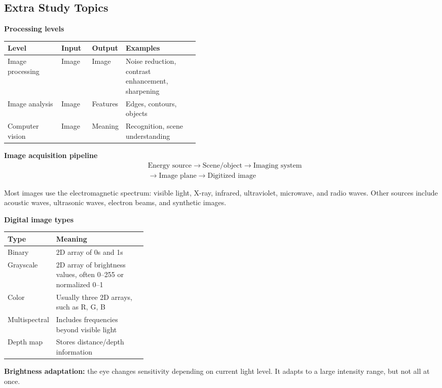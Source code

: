 \documentclass[8pt]{extarticle}
\begin{document}
\begin{multicols}{2}
\section{Extra Study Topics}

\textbf{Processing levels}

\begin{tabularx}{\linewidth}{@{}p{0.28\linewidth}p{0.16\linewidth}Y Y@{}}
\toprule
\textbf{Level} & \textbf{Input} & \textbf{Output} & \textbf{Examples} \\
\midrule
Image processing & Image & Image & Noise reduction, contrast enhancement, sharpening \\
Image analysis & Image & Features & Edges, contours, objects \\
Computer vision & Image & Meaning & Recognition, scene understanding \\
\bottomrule
\end{tabularx}

\textbf{Image acquisition pipeline}
\begin{align*}
&\text{Energy source}\rightarrow\text{Scene/object}\rightarrow\text{Imaging system}\\
&\rightarrow\text{Image plane}\rightarrow\text{Digitized image}
\end{align*}

Most images use the electromagnetic spectrum: visible light, X-ray, infrared, ultraviolet, microwave, and radio waves. Other sources include acoustic waves, ultrasonic waves, electron beams, and synthetic images.

\textbf{Digital image types}

\begin{tabularx}{\linewidth}{@{}p{0.32\linewidth}Y@{}}
\toprule
\textbf{Type} & \textbf{Meaning} \\
\midrule
Binary & 2D array of 0s and 1s \\
Grayscale & 2D array of brightness values, often 0--255 or normalized 0--1 \\
Color & Usually three 2D arrays, such as R, G, B \\
Multispectral & Includes frequencies beyond visible light \\
Depth map & Stores distance/depth information \\
\bottomrule
\end{tabularx}

\textbf{Brightness adaptation:} the eye changes sensitivity depending on current light level. It adapts to a large intensity range, but not all at once.


\end{multicols}
\end{document}
